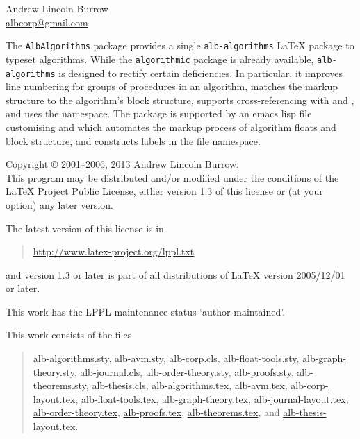 \documentclass[11pt,a4paper,oneside,titlepage]{alb-corp}
\begin{document}


\begin{albTitlePage}


  Andrew Lincoln Burrow\\
  \url{albcorp@gmail.com}



  The \texttt{AlbAlgorithms} package provides a single
  \texttt{alb-algorithms} \LaTeX{} package to typeset algorithms.  While
  the \texttt{algorithmic} package is already available,
  \texttt{alb-algorithms} is designed to rectify certain deficiencies.
  In particular, it improves line numbering for groups of procedures in
  an algorithm, matches the markup structure to the algorithm's block
  structure, supports cross-referencing with \AUCTeX{} and \RefTeX{},
  and uses the \albLogo{} namespace.  The package is supported by an
  emacs lisp file customising \AUCTeX{} and \RefTeX{} which automates
  the markup process of algorithm floats and block structure, and
  constructs labels in the file namespace.



  Copyright \copyright{} 2001--2006, 2013 Andrew Lincoln Burrow.\\
  This program may be distributed and/or modified under the conditions
  of the \LaTeX{} Project Public License, either version 1.3 of this
  license or (at your option) any later version.

  \medskip{}

  The latest version of this license is in
  \begin{quote}
    \url{http://www.latex-project.org/lppl.txt}
  \end{quote}
  and version 1.3 or later is part of all distributions of LaTeX version
  2005/12/01 or later.

  \medskip{}

  This work has the LPPL maintenance status `author-maintained'.

  \medskip{}

  This work consists of the files
  \begin{quote}
    \begin{flushleft}
      \url{alb-algorithms.sty}, \url{alb-avm.sty}, \url{alb-corp.cls},
      \url{alb-float-tools.sty}, \url{alb-graph-theory.sty},
      \url{alb-journal.cls}, \url{alb-order-theory.sty},
      \url{alb-proofs.sty}, \url{alb-theorems.sty},
      \url{alb-thesis.cls}, \url{alb-algorithms.tex}, \url{alb-avm.tex},
      \url{alb-corp-layout.tex}, \url{alb-float-tools.tex},
      \url{alb-graph-theory.tex}, \url{alb-journal-layout.tex},
      \url{alb-order-theory.tex}, \url{alb-proofs.tex},
      \url{alb-theorems.tex}, and \url{alb-thesis-layout.tex}.
    \end{flushleft}
  \end{quote}



\end{albTitlePage}
\end{document}
